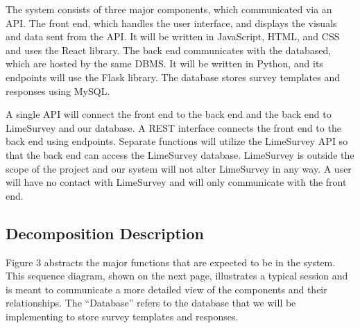 \documentclass{article}
\begin{document}
The system consists of three major components, which communicated via an API. The front end, which handles the user interface, and displays the visuals and data sent from the API. It will be written in JavaScript, HTML, and CSS and uses the React library. The back end communicates with the databased, which are hosted by the same DBMS. It will be written in Python, and its endpoints will use the Flask library.  The database stores survey templates and responses using MySQL.

A single API will connect the front end to the back end and the back end to LimeSurvey and our database. A REST interface connects the front end to the back end using endpoints. Separate functions will utilize the LimeSurvey API so that the back end can access the LimeSurvey database.  LimeSurvey is outside the scope of the project and our system will not alter LimeSurvey in any way.  A user will have no contact with LimeSurvey and will only communicate with the front end. 

\subsection{Decomposition Description}

Figure 3 abstracts the major functions that are expected to be in the system. This sequence diagram, shown on the next page, illustrates a typical session and is meant to communicate a more detailed view of the components and their relationships. The ``Database'' refers to the database that we will be implementing to store survey templates and responses.

\newpage
\end{document}
